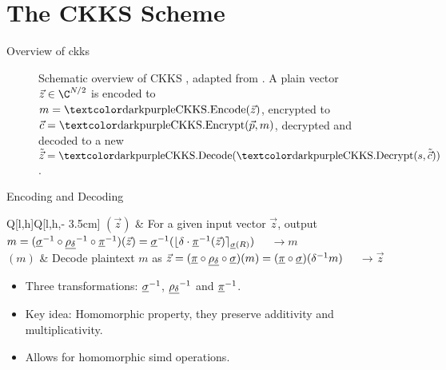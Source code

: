 \section{The CKKS Scheme}
\begin{frame}{Overview of \gls{ckks}}
  \begin{figure}[H]
    \centering
    \caption[Schematic overview of the CKKS scheme]{
      Schematic overview of CKKS \parencite{2017-ckks-original}, adapted from \cite{2020-cryptotree}.
      A plain vector $\vec{z} \in \C^{N/2}$ is encoded to $m = \cryptop{CKKS.Encode}(\vec{z})$, encrypted to $\vec{c} = \cryptop{CKKS.Encrypt}(\vec{p}, m)$, decrypted and decoded to a new $\tilde{\vec{z}} = \cryptop{CKKS.Decode}(\cryptop{CKKS.Decrypt}(s, \tilde{\vec{c}}))$.
    }
    \label{fig:ckks-overview}
  \end{figure}
\end{frame}

\begin{frame}{Encoding and Decoding}
   \\
  \begin{tblr}{Q[l,h]Q[l,h,\textwidth - 3.5cm]}
    $(\vec{z})$ & {For a given input vector $\vec{z}$, output
        $m = (\underline{\sigma}^{-1} \circ \underline{\rho_\delta}^{-1} \circ \underline{\pi}^{-1})(\vec{z}) = \underline{\sigma}^{-1}(\lfloor \delta \cdot \underline{\pi}^{-1}(\vec{z})\rceil_{\underline{\sigma}(R)})$ $\quad\rightarrow m$} \\
    $(m)$ & {Decode plaintext $m$ as
        $\vec{z} = (\underline{\pi} \circ \underline{\rho_\delta} \circ \underline{\sigma})(m) = (\underline{\pi} \circ \underline{\sigma})(\delta^{-1} m)$
        $\quad\rightarrow \vec{z}$} \\
  \end{tblr}
  \begin{itemize}
    \item Three transformations: $\underline{\sigma}^{-1}$, $\underline{\rho_\delta}^{-1}$ and $\underline{\pi}^{-1}$.
    \item Key idea: Homomorphic property, they preserve additivity and multiplicativity.
    \item Allows for homomorphic \gls{simd} operations.
  \end{itemize}
\end{frame}

